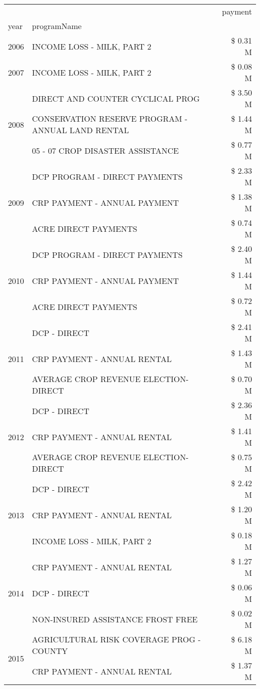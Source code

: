 \begin{tabular}{llr}
\toprule
 &  & payment \\
year & programName &  \\
\midrule
2006 & INCOME LOSS - MILK, PART 2 & \$ 0.31 M \\
\cline{1-3}
2007 & INCOME LOSS - MILK, PART 2 & \$ 0.08 M \\
\cline{1-3}
\multirow[t]{3}{*}{2008} & DIRECT AND COUNTER CYCLICAL PROG & \$ 3.50 M \\
 & CONSERVATION RESERVE PROGRAM - ANNUAL LAND RENTAL & \$ 1.44 M \\
 & 05 - 07 CROP DISASTER ASSISTANCE & \$ 0.77 M \\
\cline{1-3}
\multirow[t]{3}{*}{2009} & DCP PROGRAM - DIRECT PAYMENTS & \$ 2.33 M \\
 & CRP PAYMENT - ANNUAL PAYMENT & \$ 1.38 M \\
 & ACRE DIRECT PAYMENTS & \$ 0.74 M \\
\cline{1-3}
\multirow[t]{3}{*}{2010} & DCP PROGRAM - DIRECT PAYMENTS & \$ 2.40 M \\
 & CRP PAYMENT - ANNUAL PAYMENT & \$ 1.44 M \\
 & ACRE DIRECT PAYMENTS & \$ 0.72 M \\
\cline{1-3}
\multirow[t]{3}{*}{2011} & DCP - DIRECT & \$ 2.41 M \\
 & CRP PAYMENT - ANNUAL RENTAL & \$ 1.43 M \\
 & AVERAGE CROP REVENUE ELECTION-DIRECT & \$ 0.70 M \\
\cline{1-3}
\multirow[t]{3}{*}{2012} & DCP - DIRECT & \$ 2.36 M \\
 & CRP PAYMENT - ANNUAL RENTAL & \$ 1.41 M \\
 & AVERAGE CROP REVENUE ELECTION-DIRECT & \$ 0.75 M \\
\cline{1-3}
\multirow[t]{3}{*}{2013} & DCP - DIRECT & \$ 2.42 M \\
 & CRP PAYMENT - ANNUAL RENTAL & \$ 1.20 M \\
 & INCOME LOSS - MILK, PART 2 & \$ 0.18 M \\
\cline{1-3}
\multirow[t]{3}{*}{2014} & CRP PAYMENT - ANNUAL RENTAL & \$ 1.27 M \\
 & DCP - DIRECT & \$ 0.06 M \\
 & NON-INSURED ASSISTANCE FROST FREE & \$ 0.02 M \\
\cline{1-3}
\multirow[t]{3}{*}{2015} & AGRICULTURAL RISK COVERAGE PROG - COUNTY & \$ 6.18 M \\
 & CRP PAYMENT - ANNUAL RENTAL & \$ 1.37 M \\

\end{tabular}
